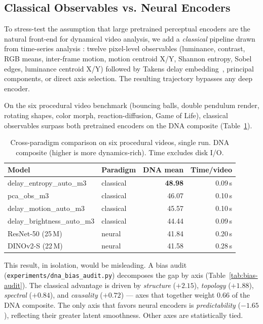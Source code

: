 \documentclass[11pt,a4paper]{article}
\begin{document}
\subsection{Classical Observables vs. Neural Encoders}

To stress-test the assumption that large pretrained perceptual
encoders are the natural front-end for dynamical video analysis, we
add a \emph{classical} pipeline drawn from time-series analysis :
twelve pixel-level observables (luminance, contrast, RGB means,
inter-frame motion, motion centroid X/Y, Shannon entropy, Sobel
edges, luminance centroid X/Y) followed by Takens delay
embedding~\cite{takens1981}, principal components, or direct
axis selection. The resulting trajectory bypasses any deep encoder.

On the six procedural video benchmark (bouncing balls, double
pendulum render, rotating shapes, color morph, reaction-diffusion,
Game of Life), classical observables surpass both pretrained
encoders on the DNA composite (Table~\ref{tab:classical-vs-neural}).

\begin{table}[h]
\centering
\caption{Cross-paradigm comparison on six procedural videos, single
run. DNA composite (higher is more dynamics-rich). Time excludes
disk I/O.}
\label{tab:classical-vs-neural}
\begin{tabular}{llrr}
\toprule
Model & Paradigm & DNA mean & Time/video \\
\midrule
delay\_entropy\_auto\_m3 & classical & \textbf{48.98} & 0.09\,s \\
pca\_obs\_m3 & classical & 46.07 & 0.10\,s \\
delay\_motion\_auto\_m3 & classical & 45.57 & 0.10\,s \\
delay\_brightness\_auto\_m3 & classical & 44.44 & 0.09\,s \\
ResNet-50 (25\,M) & neural & 41.84 & 0.20\,s \\
DINOv2-S (22\,M) & neural & 41.58 & 0.28\,s \\
\bottomrule
\end{tabular}
\end{table}

This result, in isolation, would be misleading. A bias audit
(\verb|experiments/dna_bias_audit.py|) decomposes the gap by axis
(Table~\ref{tab:bias-audit}). The classical advantage is driven by
\emph{structure} ($+2.15$), \emph{topology} ($+1.88$), \emph{spectral}
($+0.84$), and \emph{causality} ($+0.72$) — axes that together
weight 0.66 of the DNA composite. The only axis that favors neural
encoders is \emph{predictability} ($-1.65$), reflecting their
greater latent smoothness. Other axes are statistically tied.
\end{document}
